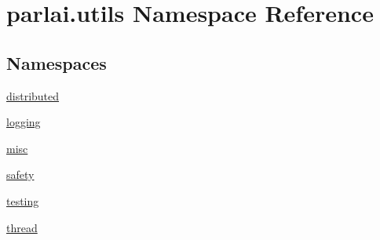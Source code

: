 \hypertarget{namespaceparlai_1_1utils}{}\section{parlai.\+utils Namespace Reference}
\label{namespaceparlai_1_1utils}
\subsection*{Namespaces}
\begin{DoxyCompactItemize}
\item 
 \hyperlink{namespaceparlai_1_1utils_1_1distributed}{distributed}
\item 
 \hyperlink{namespaceparlai_1_1utils_1_1logging}{logging}
\item 
 \hyperlink{namespaceparlai_1_1utils_1_1misc}{misc}
\item 
 \hyperlink{namespaceparlai_1_1utils_1_1safety}{safety}
\item 
 \hyperlink{namespaceparlai_1_1utils_1_1testing}{testing}
\item 
 \hyperlink{namespaceparlai_1_1utils_1_1thread}{thread}
\end{DoxyCompactItemize}

